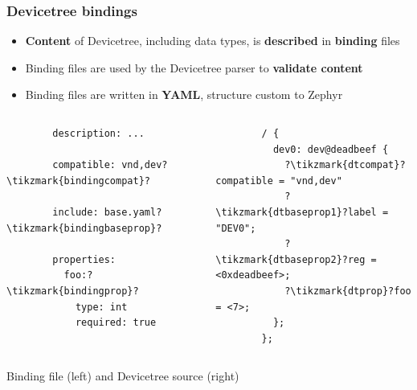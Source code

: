 \documentclass[handout]{beamer}
\begin{document}
\begin{frame}[fragile]
  \frametitle{Devicetree bindings}

  \begin{itemize}
    \item \textbf{Content} of Devicetree, including data types, is
          \textbf{described} in \textbf{binding} files
    \item Binding files are used by the Devicetree parser to
          \textbf{validate content}
    \item Binding files are written in \textbf{YAML}, structure custom to
          Zephyr
  \end{itemize}

  \begin{listing}[H]
    \begin{columns}
      \begin{column}{0.5\textwidth}
        \begin{verbatim}
        description: ...

        compatible: vnd,dev?\tikzmark{bindingcompat}?

        include: base.yaml?\tikzmark{bindingbaseprop}?

        properties:
          foo:?\tikzmark{bindingprop}?
            type: int
            required: true
      \end{verbatim}
      \end{column}
      \begin{column}{0.5\textwidth}
        \begin{verbatim}
        / {
          dev0: dev@deadbeef {
            ?\tikzmark{dtcompat}?compatible = "vnd,dev"
            ?\tikzmark{dtbaseprop1}?label = "DEV0";
            ?\tikzmark{dtbaseprop2}?reg = <0xdeadbeef>;
            ?\tikzmark{dtprop}?foo = <7>;
          };
        };
      \end{verbatim}
      \end{column}
    \end{columns}
    \caption{Binding file (left) and Devicetree source (right)}
  \end{listing}

\end{frame}
\end{document}
